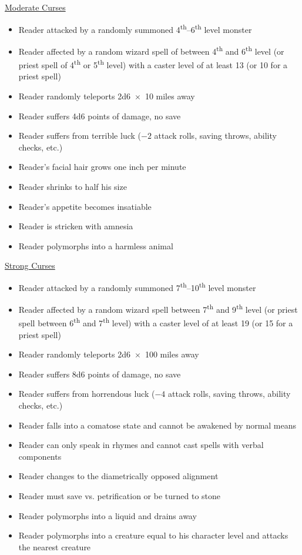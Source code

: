 \begin{multicols}{2}
\noindent \underline{Moderate Curses}

\begin{itemize}
\item Reader attacked by a randomly summoned 4\textsuperscript{th}--6\textsuperscript{th} level monster
\item Reader affected by a random wizard spell of between 4\textsuperscript{th} and 6\textsuperscript{th} level (or priest spell of 4\textsuperscript{th} or 5\textsuperscript{th} level) with a caster level of at least 13 (or 10 for a priest spell)
\item Reader randomly teleports 2d6~$\times$~10 miles away
\item Reader suffers 4d6 points of damage, no save
\item Reader suffers from terrible luck ($-2$ attack rolls, saving throws, ability checks, etc.)
\item Reader's facial hair grows one inch per minute
\item Reader shrinks to half his size
\item Reader's appetite becomes insatiable
\item Reader is stricken with amnesia
\item Reader polymorphs into a harmless animal
\end{itemize}

\noindent \underline{Strong Curses}

\begin{itemize}
\item Reader attacked by a randomly summoned 7\textsuperscript{th}--10\textsuperscript{th} level monster
\item Reader affected by a random wizard spell between 7\textsuperscript{th} and 9\textsuperscript{th} level (or priest spell between 6\textsuperscript{th} and 7\textsuperscript{th} level) with a caster level of at least 19 (or 15 for a priest spell)
\item Reader randomly teleports 2d6~$\times$~100 miles away
\item Reader suffers 8d6 points of damage, no save
\item Reader suffers from horrendous luck ($-4$ attack rolls, saving throws, ability checks, etc.)
\item Reader falls into a comatose state and cannot be awakened by normal means
\item Reader can only speak in rhymes and cannot cast spells with verbal components
\item Reader changes to the diametrically opposed alignment
\item Reader must save vs. petrification or be turned to stone
\item Reader polymorphs into a liquid and drains away
\item Reader polymorphs into a creature equal to his character level and attacks the nearest creature
\end{itemize}


\end{multicols}

